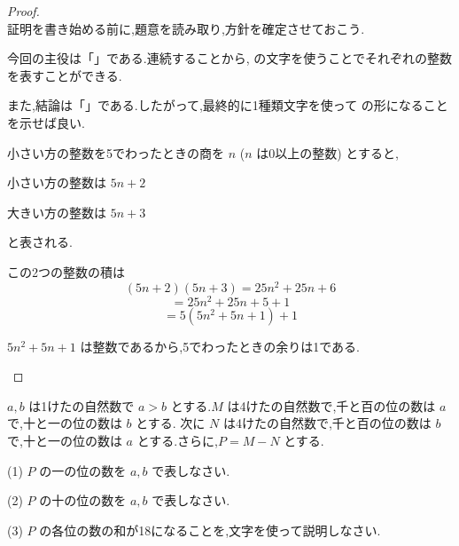 \begin{proof}\mbox{}\\
  証明を書き始める前に,題意を読み取り,方針を確定させておこう.

  今回の主役は「」である.連続することから,\fitblankbf[1種類]{} の文字を使うことでそれぞれの整数を表すことができる.

  また,結論は「\fitblankbf[5でわったときの余りが1]{}」である.したがって,最終的に1種類文字を使って  の形になることを示せば良い.
\vspace{1.5em}

  \begin{hiddenanswer}
  小さい方の整数を5でわったときの商を $n$ ($n$ は0以上の整数) とすると,

  小さい方の整数は $5n + 2$

  大きい方の整数は $5n + 3$

  と表される.

  この2つの整数の積は
  \[(5n+2)(5n+3) = 25n^2 + 25n + 6\]
  \[= 25n^2 + 25n + 5 + 1\]
  \[= 5(5n^2 + 5n + 1) + 1\]

  $5n^2 + 5n + 1$ は整数であるから,5でわったときの余りは1である.
  \end{hiddenanswer}
\end{proof}

\newpage

\begin{exercise}[1]
  $a,b$ は1けたの自然数で $a > b$ とする.$M$ は4けたの自然数で,千と百の位の数は $a$ で,十と一の位の数は $b$ とする.
  次に $N$ は4けたの自然数で,千と百の位の数は $b$ で,十と一の位の数は $a$ とする.さらに,$P = M - N$ とする.

  (1) $P$ の一の位の数を $a,b$ で表しなさい.

  (2) $P$ の十の位の数を $a,b$ で表しなさい.

  (3) $P$ の各位の数の和が18になることを,文字を使って説明しなさい.
\end{exercise}

